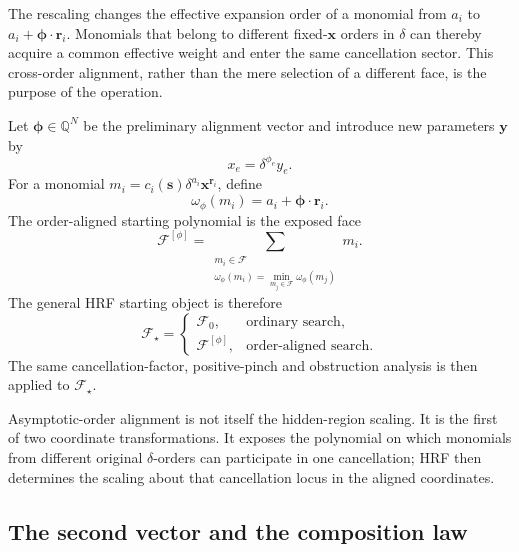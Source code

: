 \documentclass[a4paper,11pt]{article}
\newcommand{\x}{\boldsymbol{x}}
\newcommand{\s}{\boldsymbol{s}}
\begin{document}
The rescaling changes the effective expansion order of a monomial from
\(a_i\) to \(a_i+\boldsymbol\phi\cdot\boldsymbol r_i\).  Monomials that
belong to different fixed-\(\x\) orders in \(\delta\) can thereby acquire a
common effective weight and enter the same cancellation sector.  This
cross-order alignment, rather than the mere selection of a different face,
is the purpose of the operation.

Let \(\boldsymbol\phi\in\mathbb Q^N\) be the preliminary alignment vector and
introduce new parameters \(\boldsymbol y\) by
\begin{equation}
 x_e=\delta^{\phi_e}y_e.
 \label{eq:first-alignment-map}
\end{equation}
For a monomial
\(m_i=c_i(\s)\delta^{a_i}\x^{\boldsymbol r_i}\), define
\begin{equation}
 \omega_{\phi}(m_i)
 =
 a_i+\boldsymbol\phi\cdot\boldsymbol r_i.
 \label{eq:alignment-weight}
\end{equation}
The order-aligned starting polynomial is the exposed face
\begin{equation}
 \mathcal F^{[\phi]}
 =
 \sum_{\substack{m_i\in\mathcal F\\
                  \omega_\phi(m_i)=
                  \min_{m_j\in\mathcal F}\omega_\phi(m_j)}}m_i.
\label{eq:alignmentface}
\end{equation}
The general HRF starting object is therefore
\begin{equation}
 \mathcal F_\star=
 \begin{cases}
   \mathcal F_0, & \text{ordinary search},\\
   \mathcal F^{[\phi]}, & \text{order-aligned search}.
 \end{cases}
\label{eq:Fstar}
\end{equation}
The same cancellation-factor, positive-pinch and obstruction analysis is
then applied to \(\mathcal F_\star\).

Asymptotic-order alignment is not itself the hidden-region scaling.  It is
the first of two coordinate transformations.  It exposes the polynomial on
which monomials from different original \(\delta\)-orders can participate in
one cancellation; HRF then determines the scaling about that cancellation
locus in the aligned coordinates.

\subsection{The second vector and the composition law}
\end{document}
